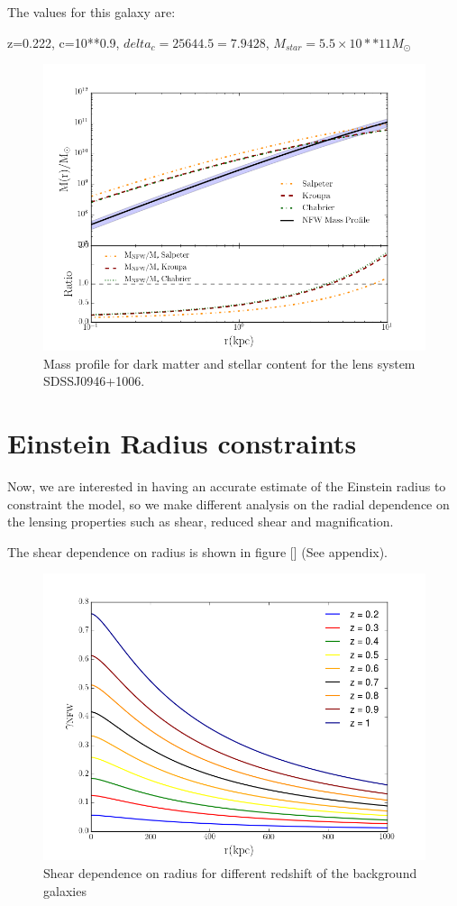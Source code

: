 The values for this galaxy are: 

z=0.222, c=10**0.9, $delta_c=25644.5=7.9428$, $M_{star}=5.5\times 10**11 M_{\odot}$

\begin{figure}[H]
\centering
\includegraphics[width=12cm]{images/DM_fraction_all_IMFs_galaxy.png}
\caption[DM and Stellar mass profiles for a massive early type galaxy.]{Mass profile for dark matter and stellar content for the lens system SDSSJ0946+1006.}
\end{figure}

\section{Einstein Radius constraints}

Now, we are interested in having an accurate estimate of the Einstein radius to constraint the model, so we make different analysis on the radial dependence on the lensing properties such as shear, reduced shear and magnification.

The shear dependence on radius is shown in figure [] (See appendix).

\begin{figure}[H]
\centering
\includegraphics[width=12cm]{images/Shear_vs_rad.png}
\caption[Shear dependence on radius]{Shear dependence on radius for different redshift of the background galaxies}
\end{figure}

